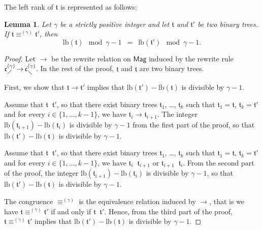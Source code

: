 \documentclass[10pt,reqno]{amsart}
\numberwithin{equation}{subsection}
\newtheorem{Lemma}[Theorem]{Lemma}
\newcommand{\Tfr}{\mathfrak{t}}
\newcommand{\Mag}{\mathsf{Mag}}
\newcommand{\LComb}[1]{\mathfrak{c}^{(#1)}_{\diagup}}
\newcommand{\RComb}[1]{\mathfrak{c}^{(#1)}_{\diagdown}}
\newcommand{\LBranch}{\mathrm{lb}}
\DeclareMathOperator{\Congr}{\equiv}
\DeclareMathOperator{\Rew}{\to}
\DeclareMathOperator{\RewRT}{\overset{*}{\Rew}}
\DeclareMathOperator{\RewRTS}{\overset{*}{\leftrightarrow}}
\newcommand{\CongrCAs}[1]{\Congr^{(#1)}}
\begin{document}
The left rank of $\Tfr$ is represented as follows: 
\medbreak

\begin{Lemma}\label{lem:left_rank_and_CongrCAs}
    Let $\gamma$ be a strictly positive integer and let $\Tfr$ and
    $\Tfr'$ be two binary trees. If $\Tfr \CongrCAs{\gamma} \Tfr'$, then
    \begin{equation}
        \LBranch(\Tfr) \mod \gamma - 1
        \enspace = \enspace
        \LBranch(\Tfr') \mod \gamma - 1.
    \end{equation}
\end{Lemma}
\begin{proof}
    Let $\Rew$ be the rewrite relation on $\Mag$ induced by the rewrite
    rule $\LComb{\gamma} \Rew \RComb{\gamma}$. In the rest of the
    proof, $\Tfr$ and $\Tfr$ are two binary trees.
    \smallbreak

    First, we show that $\Tfr \Rew \Tfr'$ implies that
    $\LBranch\left(\Tfr'\right) - \LBranch\left(\Tfr\right)$ is
    divisible by $\gamma - 1$. 
    \smallbreak

    Assume that $\Tfr \RewRT \Tfr'$, so that there exist binary trees
    $\Tfr_1$, \dots, $\Tfr_k$ such that $\Tfr_1 = \Tfr$,
    $\Tfr_k = \Tfr'$ and for every $i \in \{1, \dots, k - 1\}$, we have
    $\Tfr_i\Rew \Tfr_{i + 1}$. The integer
    \begin{math}
        \LBranch\left(\Tfr_{i + 1}\right)
        -
        \LBranch\left(\Tfr_i\right)
    \end{math}
    is divisible by $\gamma - 1$ from the first part of the proof, so
    that $\LBranch\left(\Tfr'\right) - \LBranch\left(\Tfr\right)$ is
    divisible by $\gamma-1$.
    \smallbreak

    Assume that $\Tfr \RewRTS \Tfr'$, so that there exist binary trees
    $\Tfr_1$, \dots, $\Tfr_k$ such that $\Tfr_1 = \Tfr$,
    $\Tfr_k = \Tfr'$ and for every $i \in \{1, \dots, k - 1\}$, we have
    $\Tfr_i \RewRTS \Tfr_{i + 1}$ or $\Tfr_{i + 1} \RewRTS \Tfr_i$.
    From the second part of the proof, the integer
    \begin{math}
        \LBranch\left(\Tfr_{i + 1}\right)
        -
        \LBranch\left(\Tfr_i\right)
    \end{math}
    is divisible by $\gamma - 1$, so that
    $\LBranch\left(\Tfr'\right) - \LBranch\left(\Tfr\right)$ is
    divisible by $\gamma - 1$.
    \smallbreak

    The congruence $\CongrCAs{\gamma}$ is the equivalence relation
    induced by $\Rew$, that is we have $\Tfr \CongrCAs{\gamma} \Tfr'$ if
    and only if $\Tfr \RewRTS \Tfr'$. Hence, from the third part of
    the proof, $\Tfr \CongrCAs{\gamma} \Tfr'$ implies that
    \begin{math}
        \LBranch\left(\Tfr'\right) - \LBranch\left(\Tfr\right)
    \end{math}
    is divisible by $\gamma - 1$.
\end{proof}
\medbreak
\end{document}
